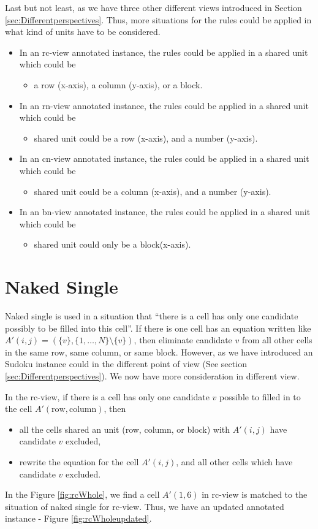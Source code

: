 \documentclass[11pt]{report}
\newcommand{\set}[1]{\{ #1 \}}
\begin{document}
Last but not least, as we have three other different views introduced in Section \ref{sec:Differentperspectives}. Thus, more situations for the rules could be applied in what kind of units have to be considered.
\begin{itemize}
\item In an rc-view annotated instance, the rules could be applied in a shared unit which could be
\begin{itemize}
\item a row (x-axis), a column (y-axis), or a block.
\end{itemize}
\item In an rn-view annotated instance, the rules could be applied in a shared unit which could be
\begin{itemize}
\item shared unit could be a row (x-axis), and a number (y-axis).
\end{itemize}
\item In an cn-view annotated instance, the rules could be applied in a shared unit which could be
\begin{itemize}
\item shared unit could be a column (x-axis), and a number (y-axis).
\end{itemize}
\item In an bn-view annotated instance, the rules could be applied in a shared unit which could be
\begin{itemize}
\item shared unit could only be a block(x-axis).
\end{itemize}
\end{itemize}

\section{Naked Single}
\label{sec:Nakedsingle}

Naked single is used in a situation that ``there is a cell has only one candidate possibly to be filled into this cell''. If there is one cell has an equation written like $A'(i,j) =(\set{v}, \set{1,\dots,N} \setminus \set{v})$, then eliminate candidate $v$ from all other cells in the same row, same column, or same block.
However, as we have introduced an Sudoku instance could in the different point of view (See section \ref{sec:Differentperspectives}). We now have more consideration in different view.

In the rc-view, if there is a cell has only one candidate $v$ possible to filled in to the cell $A'(\text{row}, \text{column})$, then
\begin{itemize}
\item all the cells shared an unit (row, column, or block) with $A'(i,j)$ have candidate $v$ excluded,
\item rewrite the equation for the cell $A'(i,j)$, and all other cells which have candidate $v$ excluded.
\end{itemize}
In the Figure \ref{fig:rcWhole}, we find a cell $A'(1,6)$ in rc-view is matched to the situation of naked single for rc-view. Thus, we have an updated annotated instance - Figure \ref{fig:rcWholeupdated}.
\end{document}
